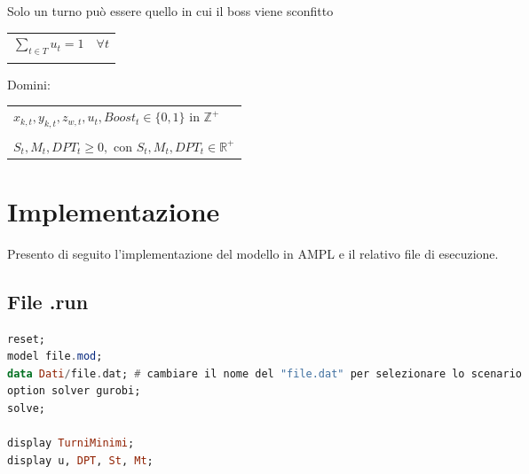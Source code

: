 \documentclass[12pt]{article}
\begin{document}
    Solo un turno può essere quello in cui il boss viene sconfitto \\
    \begin{tabular*}{\textwidth}{@{\extracolsep{\fill}} ll}
        \\
        $\sum_{t \in T} u_t = 1$  & $\forall t$\\
        \\
    \end{tabular*}

    Domini:\\
    \begin{tabular*}{\textwidth}{@{\extracolsep{\fill}} l}\\
        $x_{k,t}, y_{k,t}, z_{w,t}, u_t, Boost_t \in \{0,1\}$ in $\mathbb{Z}^+$\\
         \\
         $S_t, M_t, DPT_t \geq 0, \text{ con  } S_t, M_t, DPT_t \in \mathbb{R}^+$\\
    \end{tabular*}
    
    \section{Implementazione}
    Presento di seguito l'implementazione del modello in AMPL e il relativo file di esecuzione.\\
    \subsection{File .run}
    \begin{lstlisting}[language=haskell, frame=single, caption={File di esecuzione}, captionpos=b, keywordstyle=\color{purple}]  
reset;
model file.mod;
data Dati/file.dat; # cambiare il nome del "file.dat" per selezionare lo scenario
option solver gurobi;
solve;
        
display TurniMinimi; 
display u, DPT, St, Mt;
    \end{lstlisting}
\newpage
\end{document}
